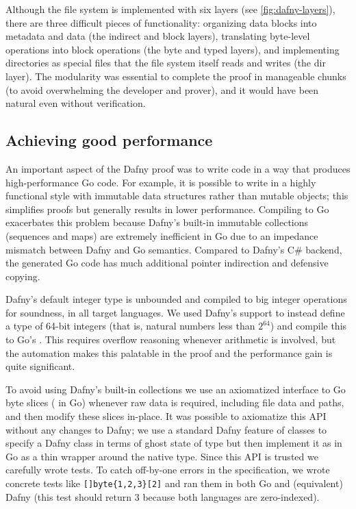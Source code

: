 Although the file system is implemented with six layers (see
\autoref{fig:dafny-layers}), there are three difficult pieces of
functionality: organizing data blocks into metadata and data (the
indirect and block layers), translating byte-level operations into
block operations (the byte and typed layers), and implementing
directories as special files that the file system itself reads and
writes (the dir layer). The modularity was essential to complete the proof in
manageable chunks (to avoid overwhelming the developer and prover), and it would
have been natural even without verification.

\subsection{Achieving good performance}

An important aspect of the Dafny proof was to write code in a way that produces
high-performance Go code. For example, it is possible to write in a highly
functional style with immutable data structures rather than mutable objects;
this simplifies proofs
but generally results in lower performance. Compiling to Go exacerbates this
problem because Dafny's built-in immutable collections (sequences and maps) are
extremely inefficient in Go due to an impedance mismatch between Dafny and Go
semantics. Compared to Dafny's C\# backend, the generated Go code has much
additional pointer indirection and defensive copying.

Dafny's default integer type  is unbounded and compiled to big integer
operations for soundness, in all target languages. We used Dafny's
 support to instead define a type of 64-bit integers (that
is, natural numbers less than $2^{64}$) and compile this to Go's .
This requires overflow reasoning whenever arithmetic is involved, but the
automation makes this palatable in the proof and the performance gain is quite
significant.

To avoid using Dafny's built-in collections we use an axiomatized interface to
Go byte slices ( in Go) whenever raw data is required, including file
data and paths, and then modify these slices in-place. It was possible to
axiomatize this API without any changes to Dafny; we use a standard Dafny
feature of  classes to specify a Dafny class  in terms of
ghost state of type  but then implement it as in Go as a thin
wrapper around the native  type. Since this API is trusted we
carefully wrote tests. To catch off-by-one errors in the specification, we wrote
concrete tests like \verb![]byte{1,2,3}[2]! and ran them in both Go and
(equivalent) Dafny (this test should return 3 because both languages are
zero-indexed).


